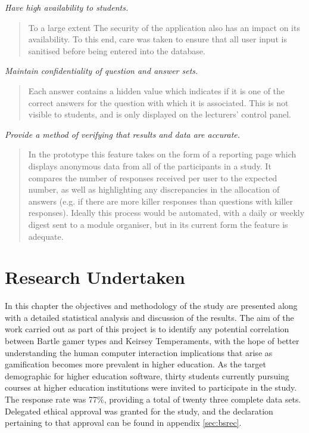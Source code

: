 \documentclass[12pt,a4paper,twoside]{report}
\begin{document}
\textit{Have high availability to students.}
\begin{quote}
To a large extent  The security of the application also has an impact on its availability. To this end, care was taken to ensure that all user input is sanitised before being entered into the database.
\end{quote}
\textit{Maintain confidentiality of question and answer sets.}
\begin{quote}
Each answer contains a hidden value which indicates if it is one of the correct answers for the question with which it is associated. This is not visible to students, and is only displayed on the lecturers' control panel.
\end{quote}
\textit{Provide a method of verifying that results and data are accurate.}
\begin{quote}
	In the prototype this feature takes on the form of a reporting page which displays anonymous data from all of the participants in a study. It compares the number of responses received per user to the expected number, as well as highlighting any discrepancies in the allocation of answers (e.g. if there are more killer responses than questions with killer responses). Ideally this process would be automated, with a daily or weekly digest sent to a module organiser, but in its current form the feature is adequate.
\end{quote}

\chapter{Research Undertaken}
\label{sec:research}
In this chapter the objectives and methodology of the study are presented along with a detailed statistical analysis and discussion of the results. The aim of the work carried out as part of this project is to identify any potential correlation between Bartle gamer types and Keirsey Temperaments, with the hope of better understanding the human computer interaction implications that arise as gamification becomes more prevalent in higher education. As the target demographic for higher education software, thirty students currently pursuing courses at higher education institutions were invited to participate in the study. The response rate was 77\%, providing a total of twenty three complete data sets. Delegated ethical approval was granted for the study, and the declaration pertaining to that approval can be found in appendix \ref{sec:bsrec}.
\end{document}
